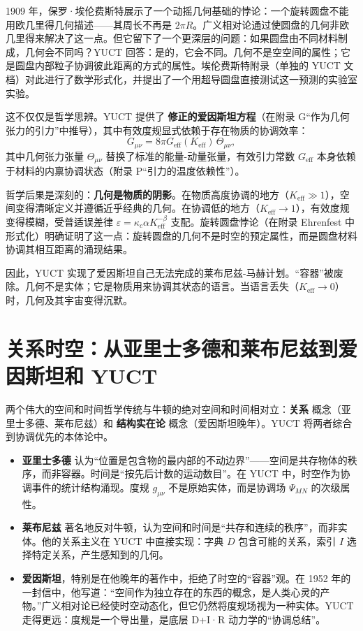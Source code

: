 \documentclass[12pt,a4paper]{article}
\begin{document}
	1909 年，保罗·埃伦费斯特展示了一个动摇几何基础的悖论：一个旋转圆盘不能用欧几里得几何描述——其周长不再是 \(2\pi R\)。广义相对论通过使圆盘的几何非欧几里得来解决了这一点。但它留下了一个更深层的问题：如果圆盘由不同材料制成，几何会不同吗？YUCT 回答：是的，它会不同。几何不是空空间的属性；它是圆盘内部粒子协调彼此距离的方式的属性。埃伦费斯特附录（单独的 YUCT 文档）对此进行了数学形式化，并提出了一个用超导圆盘直接测试这一预测的实验室实验。
	
	这不仅仅是哲学思辨。YUCT 提供了 \textbf{修正的爱因斯坦方程}（在附录 G“作为几何张力的引力”中推导），其中有效度规显式依赖于存在物质的协调效率：
	\[
	G_{\mu\nu} = 8\pi G_{\mathrm{eff}}(K_{\mathrm{eff}}) \, \Theta_{\mu\nu},
	\]
	其中几何张力张量 \(\Theta_{\mu\nu}\) 替换了标准的能量-动量张量，有效引力常数 \(G_{\mathrm{eff}}\) 本身依赖于材料的内禀协调状态（附录 P“引力的温度依赖性”）。
	
	哲学后果是深刻的：\textbf{几何是物质的阴影}。在物质高度协调的地方（\(K_{\mathrm{eff}} \gg 1\)），空间变得清晰定义并遵循近乎经典的几何。在协调低的地方（\(K_{\mathrm{eff}} \to 1\)），有效度规变得模糊，受普适误差律 \(\varepsilon = \kappa_c \alpha K_{\mathrm{eff}}^{-\beta}\) 支配。旋转圆盘悖论（在附录 Ehrenfest 中形式化）明确证明了这一点：旋转圆盘的几何不是时空的预定属性，而是圆盘材料协调其相互距离的涌现结果。
	
	因此，YUCT 实现了爱因斯坦自己无法完成的莱布尼兹-马赫计划。“容器”被废除。几何不是实体；它是物质用来协调其状态的语言。当语言丢失（\(K_{\mathrm{eff}} \to 0\)）时，几何及其宇宙变得沉默。
	
	\section{关系时空：从亚里士多德和莱布尼兹到爱因斯坦和 YUCT}
	
	两个伟大的空间和时间哲学传统与牛顿的绝对空间和时间相对立：\textbf{关系} 概念（亚里士多德、莱布尼兹）和 \textbf{结构实在论} 概念（爱因斯坦晚年）。YUCT 将两者综合到协调优先的本体论中。
	
	\begin{itemize}
		\item \textbf{亚里士多德} 认为“位置是包含物的最内部的不动边界”——空间是共存物体的秩序，而非容器。时间是“按先后计数的运动数目”。在 YUCT 中，时空作为协调事件的统计结构涌现。度规 \(g_{\mu\nu}\) 不是原始实体，而是协调场 \(\Psi_{MN}\) 的次级属性。
		
		\item \textbf{莱布尼兹} 著名地反对牛顿，认为空间和时间是“共存和连续的秩序”，而非实体。他的关系主义在 YUCT 中直接实现：字典 \(D\) 包含可能的关系，索引 \(I\) 选择特定关系，产生感知到的几何。
		
		\item \textbf{爱因斯坦}，特别是在他晚年的著作中，拒绝了时空的“容器”观。在 1952 年的一封信中，他写道：“空间作为独立存在的东西的概念，是人类心灵的产物。”广义相对论已经使时空动态化，但它仍然将度规场视为一种实体。YUCT 走得更远：度规是一个导出量，是底层 D+I·R 动力学的“协调总结”。
	\end{itemize}
	
\end{document}
